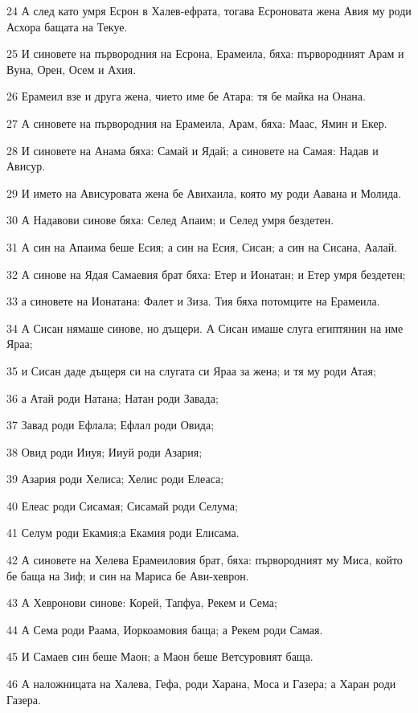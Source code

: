 \par 24 А след като умря Есрон в Халев-ефрата, тогава Есроновата жена Авия му роди Асхора бащата на Текуе.
\par 25 И синовете на първородния на Есрона, Ерамеила, бяха: първородният Арам и Вуна, Орен, Осем и Ахия.
\par 26 Ерамеил взе и друга жена, чието име бе Атара: тя бе майка на Онана.
\par 27 А синовете на първородния на Ерамеила, Арам, бяха: Маас, Ямин и Екер.
\par 28 И синовете на Анама бяха: Самай и Ядай; а синовете на Самая: Надав и Ависур.
\par 29 И името на Ависуровата жена бе Авихаила, която му роди Аавана и Молида.
\par 30 А Надавови синове бяха: Селед Апаим; и Селед умря бездетен.
\par 31 А син на Апаима беше Есия; а син на Есия, Сисан; а син на Сисана, Аалай.
\par 32 А синове на Ядая Самаевия брат бяха: Етер и Ионатан; и Етер умря бездетен;
\par 33 а синовете на Ионатана: Фалет и Зиза. Тия бяха потомците на Ерамеила.
\par 34 А Сисан нямаше синове, но дъщери. А Сисан имаше слуга египтянин на име Яраа;
\par 35 и Сисан даде дъщеря си на слугата си Яраа за жена; и тя му роди Атая;
\par 36 а Атай роди Натана; Натан роди Завада;
\par 37 Завад роди Ефлала; Ефлал роди Овида;
\par 38 Овид роди Ииуя; Ииуй роди Азария;
\par 39 Азария роди Хелиса; Хелис роди Елеаса;
\par 40 Елеас роди Сисамая; Сисамай роди Селума;
\par 41 Селум роди Екамия;а Екамия роди Елисама.
\par 42 А синовете на Хелева Ерамеиловия брат, бяха: първородният му Миса, който бе баща на Зиф; и син на Мариса бе Ави-хеврон.
\par 43 А Хевронови синове: Корей, Тапфуа, Рекем и Сема;
\par 44 А Сема роди Раама, Иоркоамовия баща; а Рекем роди Самая.
\par 45 И Самаев син беше Маон; а Маон беше Ветсуровият баща.
\par 46 А наложницата на Халева, Гефа, роди Харана, Моса и Газера; а Харан роди Газера.
